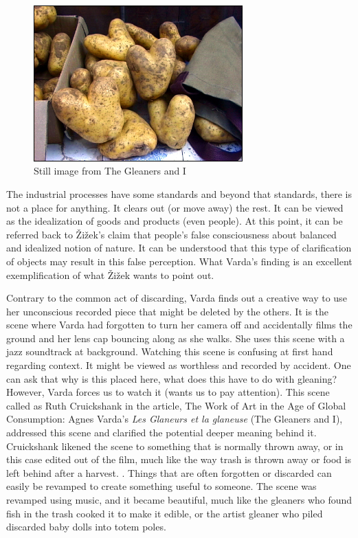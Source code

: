 \begin{figure}[h!]
  \centering
  \includegraphics[height=6cm]{graphics/AgnesVarda_Potatoes.jpg}
  \caption{Still image from The Gleaners and I}
  \label{fig:AgnesVarda_Potatoes}
\end{figure}

The industrial processes have some standards and beyond that standards, there is not a place for anything. It clears out (or move away) the rest. It can be viewed as the idealization of goods and products (even people). At this point, it can be referred back to Žižek’s claim that people’s false consciousness about balanced and idealized notion of nature. It can be understood that this type of clarification of objects may result in this false perception. What Varda’s finding is an excellent exemplification of what Žižek wants to point out.

Contrary to the common act of discarding, Varda finds out a creative way to use her unconscious recorded piece that might be deleted by the others. It is the scene where Varda had forgotten to turn her camera off and accidentally films the ground and her lens cap bouncing along as she walks. She uses this scene with a jazz soundtrack at background. Watching this scene is confusing at first hand regarding context. It might be viewed as worthless and recorded by accident. One can ask that why is this placed here, what does this have to do with gleaning? However, Varda forces us to watch it (wants us to pay attention). This scene called as  Ruth Cruickshank in the article, The Work of Art in the Age of Global Consumption: Agnes Varda’s \textit{Les Glaneurs et la glaneuse} (The Gleaners and I), addressed this scene and clarified the potential deeper meaning behind it. Cruickshank likened the scene to something that is normally thrown away, or in this case edited out of the film, much like the way trash is thrown away or food is left behind after a harvest.  \cite{cruickshank2007work}. Things that are often forgotten or discarded can easily be revamped to create something useful to someone. The scene was revamped using music, and it became beautiful, much like the gleaners who found fish in the trash cooked it to make it edible, or the artist gleaner who piled discarded baby dolls into totem poles.

